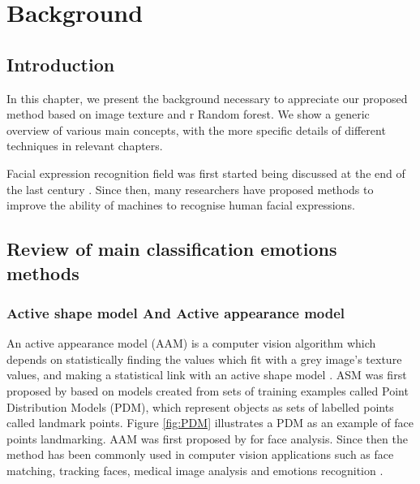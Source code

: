  \chapter{Background}
 \minitoc


 \section{Introduction}
 \label{sec:ch1_Introduction }


 
 In this chapter, we present the background necessary to appreciate our proposed method based on image texture and r Random forest. We show a generic overview of various main concepts, with the more specific details of different techniques in relevant chapters. 
 
 Facial expression recognition field was first started being discussed at the end of the last century \citep{essa1995facial}. Since then, many researchers have proposed methods to improve the ability of machines to recognise human facial expressions.   

\section{Review of main classification emotions methods }
 
\subsection{Active shape model And  Active appearance model}
\label{sec:ch1_ASM}
An active appearance model (AAM) \citep{edwards1998interpreting, cootes1998activeApearance,cootes2001active} is a computer vision algorithm which depends on  statistically finding the values which fit with a grey image's texture values, and making a statistical link with an active shape model \citep{cootes1992active,cootes1992training,cootes1995active}.
ASM was first proposed by \citet{cootes1992active} based on models created from sets of training examples called Point Distribution Models (PDM), which represent objects as sets of labelled points called landmark points. Figure \ref{fig:PDM} illustrates a PDM as an example of face points landmarking. AAM was first proposed by \citet{edwards1998interpreting} for face analysis. Since then the method has been commonly used in computer vision applications such as face matching, tracking faces, medical image analysis and emotions recognition \citep{ratliff2008emotion,ko2010development,setyati2012facial,lozano2014facial,chen2013gc,yu2013pose}. 

